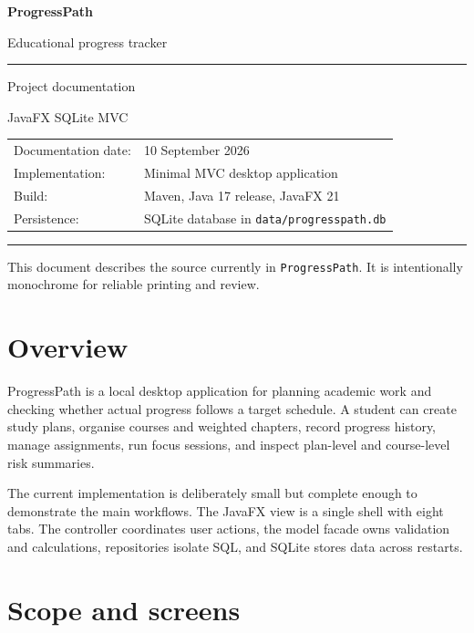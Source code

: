 \documentclass[11pt,a4paper]{article}
\newcommand{\code}[1]{\texttt{#1}}
\newcommand{\blackrule}{\rule{\linewidth}{0.6pt}}
\begin{document}
\thispagestyle{empty}
\vspace*{25mm}
{\Huge\bfseries ProgressPath}\par
\vspace{3mm}
{\Large Educational progress tracker}\par
\vspace{10mm}
\blackrule
\vspace{5mm}
{\large Project documentation}\par
\vspace{2mm}
JavaFX \textbullet{} SQLite \textbullet{} MVC\par
\vspace{12mm}
\begin{tabular}{@{}ll@{}}
  Documentation date: & 10 September 2026\\
  Implementation: & Minimal MVC desktop application\\
  Build: & Maven, Java 17 release, JavaFX 21\\
  Persistence: & SQLite database in \code{data/progresspath.db}
\end{tabular}
\vfill
\blackrule
\vspace{3mm}
\small This document describes the source currently in \code{ProgressPath}. It is intentionally monochrome for reliable printing and review.
\newpage

\tableofcontents
\newpage

\section{Overview}

ProgressPath is a local desktop application for planning academic work and checking whether actual progress follows a target schedule. A student can create study plans, organise courses and weighted chapters, record progress history, manage assignments, run focus sessions, and inspect plan-level and course-level risk summaries.

The current implementation is deliberately small but complete enough to demonstrate the main workflows. The JavaFX view is a single shell with eight tabs. The controller coordinates user actions, the model facade owns validation and calculations, repositories isolate SQL, and SQLite stores data across restarts.

\section{Scope and screens}
\end{document}
